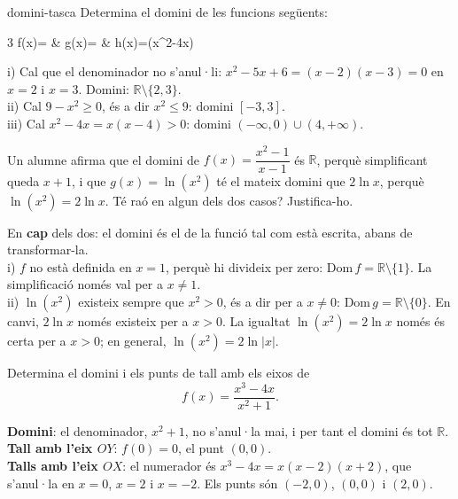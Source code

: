 \begin{apartats}

\begin{tria}{domini-tasca}
Determina el domini de les funcions següents:
\begin{graella}{3}
  \sa f(x)= & \sa g(x)= & \sa h(x)=\ln\left(x^2-4x\right)
\end{graella}

\begin{solucio}
i) Cal que el denominador no s'anul·li: $x^2-5x+6=(x-2)(x-3)=0$ en $x=2$ i $x=3$. Domini:
$\mathbb{R}\setminus\{2,3\}$.\\
ii) Cal $9-x^2\ge0$, és a dir $x^2\le9$: domini $[-3,3]$.\\
iii) Cal $x^2-4x=x(x-4)>0$: domini $(-\infty,0)\cup(4,+\infty)$.
\end{solucio}

Un alumne afirma que el domini de $f(x)=\dfrac{x^2-1}{x-1}$ és $\mathbb{R}$, perquè simplificant queda
$x+1$, i que $g(x)=\ln\left(x^2\right)$ té el mateix domini que $2\ln x$, perquè
$\ln\left(x^2\right)=2\ln x$. Té raó en algun dels dos casos? Justifica-ho.

\begin{solucio}
En \textbf{cap} dels dos: el domini és el de la funció tal com està escrita, abans de transformar-la.\\
i) $f$ no està definida en $x=1$, perquè hi divideix per zero: $\mathrm{Dom}\,f=\mathbb{R}\setminus\{1\}$.
La simplificació només val per a $x\neq1$.\\
ii) $\ln\left(x^2\right)$ existeix sempre que $x^2>0$, és a dir per a $x\neq0$:
$\mathrm{Dom}\,g=\mathbb{R}\setminus\{0\}$. En canvi, $2\ln x$ només existeix per a $x>0$. La igualtat
$\ln\left(x^2\right)=2\ln x$ només és certa per a $x>0$; en general, $\ln\left(x^2\right)=2\ln|x|$.
\end{solucio}
\end{tria}

Determina el domini i els punts de tall amb els eixos de
\[
f(x)=\frac{x^3-4x}{x^2+1} .
\]

\begin{solucio}
\textbf{Domini}: el denominador, $x^2+1$, no s'anul·la mai, i per tant el domini és tot $\mathbb{R}$.\\
\textbf{Tall amb l'eix $OY$}: $f(0)=0$, el punt $(0,0)$.\\
\textbf{Talls amb l'eix $OX$}: el numerador és $x^3-4x=x(x-2)(x+2)$, que s'anul·la en $x=0$, $x=2$ i
$x=-2$. Els punts són $(-2,0)$, $(0,0)$ i $(2,0)$.
\end{solucio}


\end{apartats}

